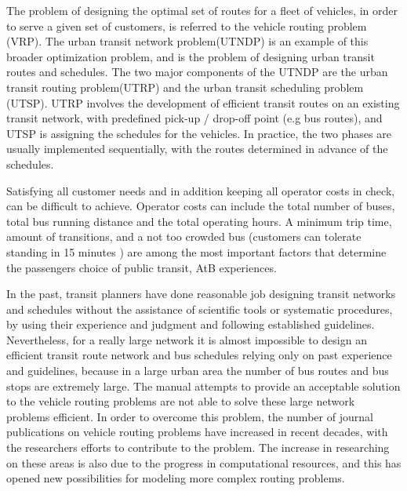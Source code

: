 The problem of designing the optimal set of routes for a fleet of vehicles, in order to serve a given set of customers, is referred to the vehicle routing problem (VRP). The urban transit network problem(UTNDP) is an example of this broader optimization problem, and is the problem of designing urban transit routes and schedules. The two major components of the UTNDP are the urban transit routing problem(UTRP) and the urban transit scheduling problem (UTSP). UTRP involves the development of efficient transit routes on an existing transit network, with predefined pick-up / drop-off point (e.g bus routes), and UTSP is assigning the schedules for the vehicles. In practice, the two phases are usually implemented sequentially, with the routes determined in advance of the schedules.%

Satisfying all customer needs and in addition keeping all operator costs in check, can be difficult to achieve. Operator costs can include the total number of buses, total bus running distance and the total operating hours. A minimum trip time, amount of transitions, and a not too crowded bus (customers can tolerate standing in 15 minutes ) are among the most important factors that determine the passengers choice of public transit, AtB experiences. 

In the past, transit planners have done reasonable job designing transit networks and schedules without the assistance of scientific tools or systematic procedures, by using their experience and judgment and following established guidelines. Nevertheless, for a really large network it is almost impossible to design an efficient transit route network and bus schedules relying only on past experience and guidelines, because in a large urban area the number of bus routes and bus stops are extremely large. The manual attempts to provide an acceptable solution to the vehicle routing problems are not able to solve these large network problems efficient. In order to overcome this problem, the number of journal publications on vehicle routing problems have increased in recent decades, with the researchers efforts to contribute to the problem.  The increase in researching on these areas is also due to the progress in computational resources, and this has opened new possibilities for modeling more complex routing problems. %

